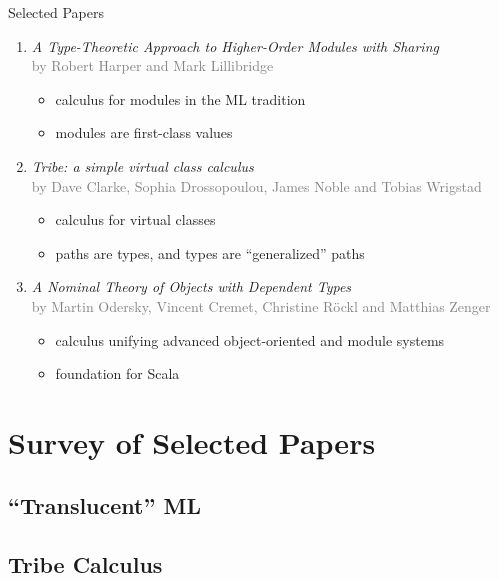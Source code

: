 \documentclass{beamer}
\begin{document}
\begin{frame}{Selected Papers}
\begin{enumerate}
\item {\it A Type-Theoretic Approach to Higher-Order
  Modules with Sharing}\\{\footnotesize\textcolor{gray}{by Robert Harper and Mark
  Lillibridge}}\begin{itemize}
\item calculus for modules in the ML tradition
\item modules are first-class values
\end{itemize}
\item {\it Tribe: a simple virtual class calculus}\\
  {\footnotesize\textcolor{gray}{by Dave Clarke, Sophia Drossopoulou, James Noble and Tobias Wrigstad}}\begin{itemize}
\item calculus for virtual classes
\item paths are types, and types are ``generalized'' paths
\end{itemize}
\item {\it A Nominal Theory of Objects with Dependent
  Types}\\{\footnotesize\textcolor{gray}{by Martin Odersky, Vincent Cremet, Christine R{\"o}ckl and
  Matthias Zenger}}\begin{itemize}
\item calculus unifying advanced object-oriented and module systems
\item foundation for Scala
\end{itemize}
\end{enumerate}
\end{frame}

\section{Survey of Selected Papers}

\subsection{``Translucent'' ML}

\subsection{Tribe Calculus}
\end{document}
